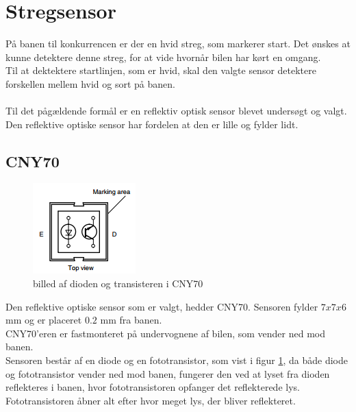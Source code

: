 \section{Stregsensor}
På banen til konkurrencen er der en hvid streg, som markerer start. Det ønskes at kunne detektere denne streg, for at vide hvornår bilen har kørt en omgang.\\
Til at dektektere startlinjen, som er hvid, skal den valgte sensor detektere forskellen mellem hvid og sort på banen.\\
 \\
Til det pågældende formål er en reflektiv optisk sensor blevet undersøgt og valgt. Den reflektive optiske sensor har fordelen at den er lille og fylder lidt.\\

\subsection{CNY70}
\begin{figure}
\includegraphics[scale=0.7]{./Graphics/CNY70-Diode}
\caption{billed af dioden og transisteren i CNY70}
\label{CNY70}
\end{figure}
Den reflektive optiske sensor som er valgt, hedder CNY70. Sensoren fylder $7x7x6$ mm og er placeret $0.2$ mm fra banen. \\
CNY70'eren er fastmonteret på undervognene af bilen, som vender ned mod banen.\\

Sensoren består af en diode og en fototransistor, som vist i figur \ref{CNY70}, da både diode og fototransistor vender ned mod banen, fungerer den ved at lyset fra dioden reflekteres i banen, hvor fototransistoren opfanger det reflekterede lys. Fototransistoren åbner alt efter hvor meget lys, der bliver reflekteret. \\

